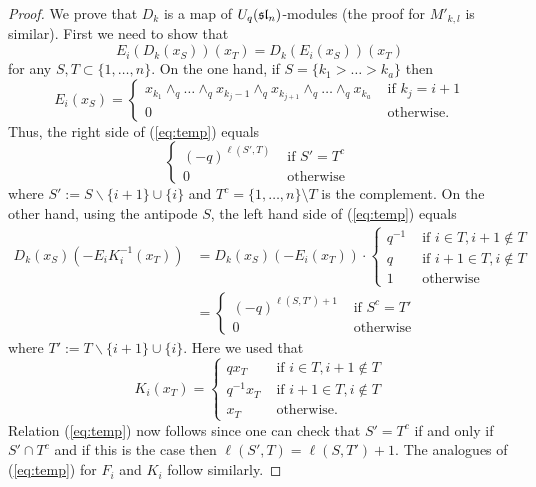 \documentclass[11pt]{amsart}
\begin{document}
\begin{proof}
We prove that $D_k$ is a map of $U_q(\sl_n)$-modules (the proof for $M'_{k,l}$ is similar). First we need to show that
\begin{equation}\label{eq:temp}
E_i(D_k(x_S))(x_T) = D_k(E_i(x_S))(x_T)
\end{equation}
for any $S,T \subset \{1,\dots,n\}$. On the one hand, if $S = \{k_1 > \dots > k_a\}$ then
$$E_i(x_S) = \begin{cases} x_{k_1} \wedge_q \dots \wedge_q x_{k_j-1} \wedge_q x_{k_{j+1}} \wedge_q \dots \wedge_q x_{k_a} & \text{ if } k_j = i+1 \\ 0 & \text{ otherwise. } \end{cases}$$
Thus, the right side of (\ref{eq:temp}) equals
$$\begin{cases} (-q)^{\ell(S',T)} & \text{ if } S' = T^c \\ 0 & \text{ otherwise } \end{cases}$$
where $S' := S \smallsetminus \{ i+1 \} \cup \{ i \}$ and $T^c = \{1, \dots, n\} \setminus T$ is the complement. On the other hand, using the antipode $S$, the left hand side of (\ref{eq:temp}) equals
\begin{align*}
D_k(x_S) (- E_iK_i^{-1}(x_T))
&= D_k(x_S) (-E_i(x_T)) \cdot \begin{cases} q^{-1} & \text{ if } i \in T, i+1 \not\in T \\ q & \text{ if } i+1 \in T, i \not\in T \\ 1 & \text{ otherwise } \end{cases} \\
&= \begin{cases} (-q)^{\ell(S,T')+1} & \text{ if } S^c = T' \\ 0 & \text{ otherwise } \end{cases}
\end{align*}
where $T' := T \smallsetminus \{i+1\} \cup \{ i \}$. Here we used that
$$K_i(x_T) = \begin{cases} q x_T & \text{ if } i \in T, i+1 \not\in T \\ q^{-1} x_T & \text{ if } i+1 \in T, i \not\in T \\ x_T & \text{ otherwise. } \end{cases}$$
Relation (\ref{eq:temp}) now follows since one can check that $S' = T^c$ if and only if $S' \cap T^c$ and if this is the case then $\ell(S',T) = \ell(S,T')+1$. The analogues of (\ref{eq:temp}) for $F_i$ and $K_i$ follow similarly.
\end{proof}
\end{document}
